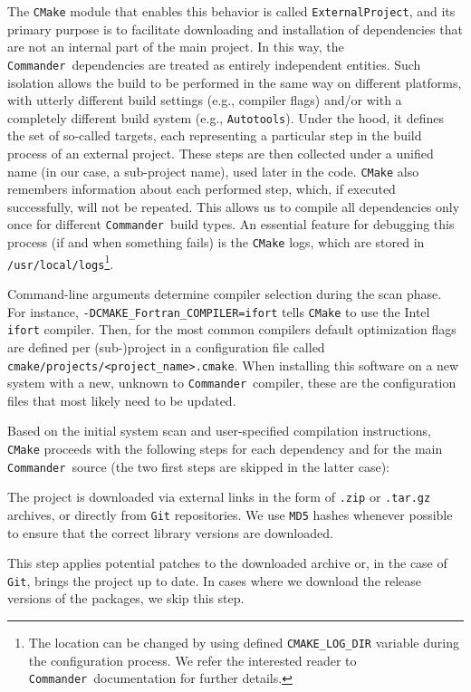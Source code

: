 \documentclass[twocolumn]{aa}
\def\commander{\texttt{Commander}}
\begin{document}
The \texttt{CMake} module that enables this behavior is called \texttt{ExternalProject}, and its primary purpose is to facilitate downloading and installation of dependencies that are not an internal part of the main project. In this way, the \commander\ dependencies are treated as entirely independent entities. Such isolation allows the build to be performed in the same way on different platforms, with utterly different build settings (e.g., compiler flags) and/or with a completely different build system (e.g., \texttt{Autotools}). Under the hood, it defines the set of so-called targets, each representing a particular step in the build process of an external project. These steps are then collected under a unified name (in our case, a sub-project name), used later in the code. \texttt{CMake} also remembers information about each performed step, which, if executed successfully, will not be repeated. This allows us to compile all dependencies only once for different \commander\ build types. An essential feature for debugging this process (if and when something fails) is the \texttt{CMake} logs, which are stored in \texttt{/usr/local/logs}\footnote{The location can be changed by using defined \texttt{CMAKE\_LOG\_DIR} variable during the configuration process. We refer the interested reader to \commander\ documentation for further details.}.

Command-line arguments determine compiler selection during the scan phase. For instance, \texttt{-DCMAKE\_Fortran\_COMPILER=ifort} tells \texttt{CMake} to use the Intel \texttt{ifort} compiler. Then, for the most common compilers default optimization flags are defined per (sub-)project in a configuration file called \texttt{cmake/projects/{<project\_name>}.cmake}. When installing this software on a new system with a new, unknown to \commander\, compiler, these are the configuration files that most likely need to be updated.

Based on the initial system scan and user-specified compilation instructions, \texttt{CMake} proceeds with the following steps for each dependency and for the main \commander\ source (the two first steps are skipped in the latter case):

 The project is downloaded via external links in the form of \texttt{.zip} or \texttt{.tar.gz} archives, or directly from \texttt{Git} repositories. We use \texttt{MD5} hashes whenever possible to ensure that the correct library versions are downloaded.

 This step applies potential patches to the downloaded archive or, in the case of \texttt{Git}, brings the project up to date. In cases where we download the release versions of the packages, we skip this step.
\end{document}
